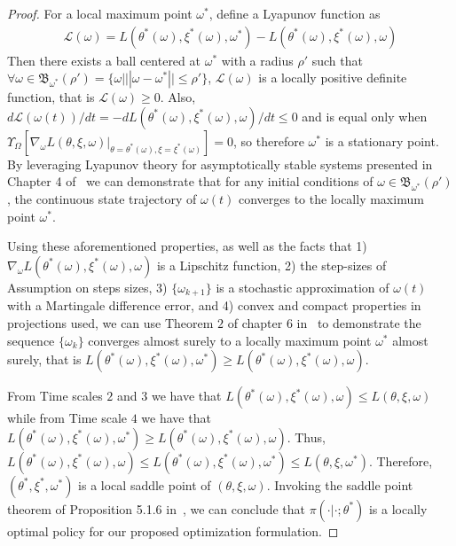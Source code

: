 \documentclass{article}
\theoremstyle{definition}
\begin{document}
\begin{proof}
For a local maximum point $\omega^*$, define a Lyapunov function as
\begin{align*}
    \mathcal{L}(\omega) = L(\theta^*(\omega),\xi^*(\omega),\omega^*) - L(\theta^*(\omega),\xi^*(\omega),\omega)
\end{align*}
Then there exists a ball centered at $\omega^*$ with a radius $\rho'$ such that $\forall \omega\in \mathfrak{B}_{\omega^*}(\rho')=\{\omega | ||\omega - \omega^*|| \leq \rho'  \}$, $\mathcal{L}(\omega)$ is a locally positive definite function, that is  $\mathcal{L}(\omega) \geq 0$. Also, $d\mathcal{L}(\omega(t))/dt = -dL(\theta^*(\omega),\xi^*(\omega),\omega)/dt\leq 0$ and is equal only when $\Upsilon_\Omega[\nabla_\omega L(\theta, \xi, \omega)|_{\theta=\theta^*(\omega),\xi=\xi^*(\omega)}] = 0$, so therefore $\omega^*$ is a stationary point. By leveraging Lyapunov theory for asymptotically stable systems presented in Chapter 4 of~\cite{khalil2002} we can demonstrate that for any initial conditions of $\omega \in \mathfrak{B}_{\omega^*}(\rho')$, the continuous state trajectory of $\omega(t)$ converges to the locally maximum point $\omega^*$.

Using these aforementioned properties, as well as the facts that 1) $\nabla_\omega L(\theta^*(\omega), \xi^*(\omega), \omega)$ is a Lipschitz function, 2) the step-sizes of Assumption on steps sizes, 3) $\{ \omega_{k+1} \}$ is a stochastic approximation of $\omega(t)$ with a Martingale difference error, and 4) convex and compact properties in projections used, we can use Theorem $2$ of chapter $6$ in~\cite{borkar2009stochastic} to demonstrate the sequence $\{\omega_k\}$ converges almost surely to a locally maximum point $\omega^*$ almost surely, that is $L(\theta^*(\omega),\xi^*(\omega),\omega^*) \geq L(\theta^*(\omega),\xi^*(\omega),\omega)$.

From Time scales $2$ and $3$ we have that $L(\theta^*(\omega),\xi^*(\omega),\omega) \leq L(\theta, \xi, \omega)$ while from Time scale $4$ we have that $L(\theta^*(\omega),\xi^*(\omega),\omega^*) \geq L(\theta^*(\omega),\xi^*(\omega),\omega)$. Thus, $L(\theta^*(\omega),\xi^*(\omega),\omega)  \leq L(\theta^*(\omega),\xi^*(\omega),\omega^*) \leq L(\theta, \xi, \omega^*)$. Therefore, $(\theta^*,\xi^*,\omega^*)$ is a local saddle point of $(\theta,\xi,\omega)$. Invoking the saddle point theorem of Proposition 5.1.6 in~\cite{bertsekas1997nonlinear}, we can conclude that $\pi(\cdot|\cdot; \theta^*)$ is a locally optimal policy for our proposed optimization formulation.
\end{proof}
\end{document}
